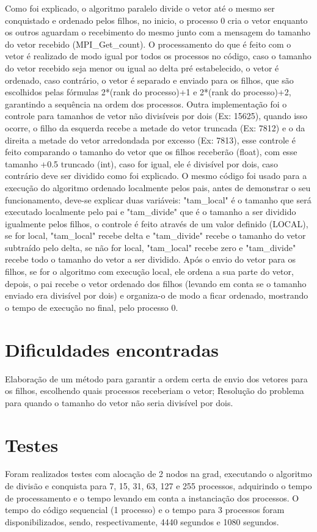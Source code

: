 \documentclass{article}
\begin{document}
\begin{multicols*}{2}
Como foi explicado, o algoritmo paralelo divide o vetor até o mesmo ser conquistado e ordenado pelos filhos, no inicio, o processo 0 cria o vetor enquanto os outros aguardam o recebimento do mesmo junto com a mensagem do tamanho do vetor recebido (MPI\_Get\_count). O processamento do que é feito com o vetor é realizado de modo igual por todos os processos no código, caso o tamanho do vetor recebido seja menor ou igual ao delta pré estabelecido, o vetor é ordenado, caso contrário, o vetor é separado e enviado para os filhos, que são escolhidos pelas fórmulas 2*(rank do processo)+1 e 2*(rank do processo)+2, garantindo a sequência na ordem dos processos. Outra implementação foi o controle para tamanhos de vetor não divisíveis por dois (Ex: 15625), quando isso ocorre, o filho da esquerda recebe a metade do vetor truncada (Ex: 7812) e o da direita a metade do vetor arredondada por excesso (Ex: 7813), esse controle é feito comparando o tamanho do vetor que os filhos receberão (float), com esse tamanho +0.5 truncado (int), caso for igual, ele é divisível por dois, caso contrário deve ser dividido como foi explicado. O mesmo código foi usado para a execução do algoritmo ordenado localmente pelos pais, antes de demonstrar o seu funcionamento, deve-se explicar duas variáveis: "tam\_local" é o tamanho que será executado localmente pelo pai e "tam\_divide" que é o tamanho a ser dividido igualmente pelos filhos, o controle é feito através de um valor definido (LOCAL), se for local, "tam\_local" recebe delta e "tam\_divide" recebe o tamanho do vetor subtraído pelo delta, se não for local, "tam\_local" recebe zero e "tam\_divide" recebe todo o tamanho do vetor a ser dividido. Após o envio do vetor para os filhos, se for o algoritmo com execução local, ele ordena a sua parte do vetor, depois, o pai recebe o vetor ordenado dos filhos (levando em conta se o tamanho enviado era divisível por dois) e organiza-o de modo a ficar ordenado, mostrando o tempo de execução no final, pelo processo 0.

\section{Dificuldades encontradas}
Elaboração de um método para garantir a ordem certa de envio dos vetores para os filhos, escolhendo quais processos receberiam o vetor; Resolução do problema para quando o tamanho do vetor não seria divisível por dois.

\section{Testes}
Foram realizados testes com alocação de 2 nodos na grad, executando o algoritmo de divisão e conquista para 7, 15, 31, 63, 127 e 255 processos, adquirindo o tempo de processamento e o tempo levando em conta a instanciação dos processos. O tempo do código sequencial (1 processo) e o tempo para 3 processos foram disponibilizados, sendo, respectivamente, 4440 segundos e 1080 segundos.


\end{multicols*}
\end{document}

